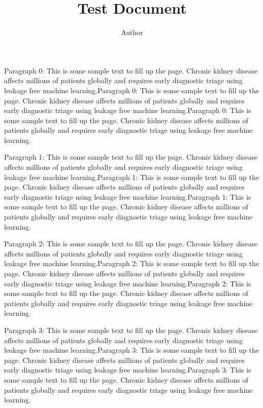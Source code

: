 \documentclass{IEEEtran}
\begin{document}
\title{Test Document}
\author{Author}
\maketitle

Paragraph 0: This is some sample text to fill up the page. Chronic kidney disease affects millions of patients globally and requires early diagnostic triage using leakage free machine learning.Paragraph 0: This is some sample text to fill up the page. Chronic kidney disease affects millions of patients globally and requires early diagnostic triage using leakage free machine learning.Paragraph 0: This is some sample text to fill up the page. Chronic kidney disease affects millions of patients globally and requires early diagnostic triage using leakage free machine learning.

Paragraph 1: This is some sample text to fill up the page. Chronic kidney disease affects millions of patients globally and requires early diagnostic triage using leakage free machine learning.Paragraph 1: This is some sample text to fill up the page. Chronic kidney disease affects millions of patients globally and requires early diagnostic triage using leakage free machine learning.Paragraph 1: This is some sample text to fill up the page. Chronic kidney disease affects millions of patients globally and requires early diagnostic triage using leakage free machine learning.

Paragraph 2: This is some sample text to fill up the page. Chronic kidney disease affects millions of patients globally and requires early diagnostic triage using leakage free machine learning.Paragraph 2: This is some sample text to fill up the page. Chronic kidney disease affects millions of patients globally and requires early diagnostic triage using leakage free machine learning.Paragraph 2: This is some sample text to fill up the page. Chronic kidney disease affects millions of patients globally and requires early diagnostic triage using leakage free machine learning.

Paragraph 3: This is some sample text to fill up the page. Chronic kidney disease affects millions of patients globally and requires early diagnostic triage using leakage free machine learning.Paragraph 3: This is some sample text to fill up the page. Chronic kidney disease affects millions of patients globally and requires early diagnostic triage using leakage free machine learning.Paragraph 3: This is some sample text to fill up the page. Chronic kidney disease affects millions of patients globally and requires early diagnostic triage using leakage free machine learning.
\end{document}
